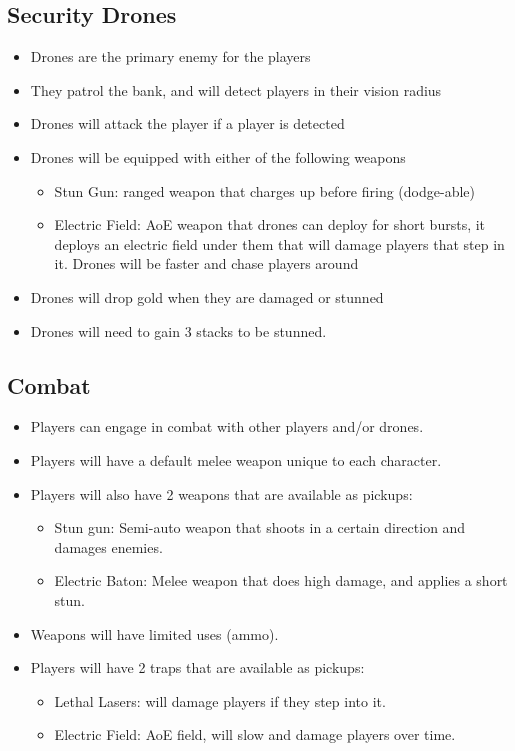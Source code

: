 \documentclass[11pt]{report}
\begin{document}
\subsection{Security Drones}
\begin{itemize}
    \item Drones are the primary enemy for the players
    \item They patrol the bank, and will detect players in their vision radius
    \item Drones will attack the player if a player is detected
    \item Drones will be equipped with either of the following weapons
    \begin{itemize}
        \item Stun Gun: ranged weapon that charges up before firing (dodge-able)
        \item Electric Field: AoE weapon that drones can deploy for short bursts, it deploys an electric field under them that will damage players that step in it. Drones will be faster and chase players around
    \end{itemize}
    \item Drones will drop gold when they are damaged or stunned
    \item Drones will need to gain 3 stacks to be stunned.
\end{itemize}

\subsection{Combat}
\begin{itemize}
    \item Players can engage in combat with other players and/or drones.
    \item Players will have a default melee weapon unique to each character.
    \item Players will also have 2 weapons that are available as pickups:
    \begin{itemize}
        \item Stun gun: Semi-auto weapon that shoots in a certain direction and damages enemies.
        \item Electric Baton: Melee weapon that does high damage, and applies a short stun.
    \end{itemize}
    \item Weapons will have limited uses (ammo).
    \item Players will have 2 traps that are available as pickups:
    \begin{itemize}
        \item Lethal Lasers: will damage players if they step into it.
        \item Electric Field: AoE field, will slow and damage players over time.
    \end{itemize}
\end{itemize}
\end{document}
